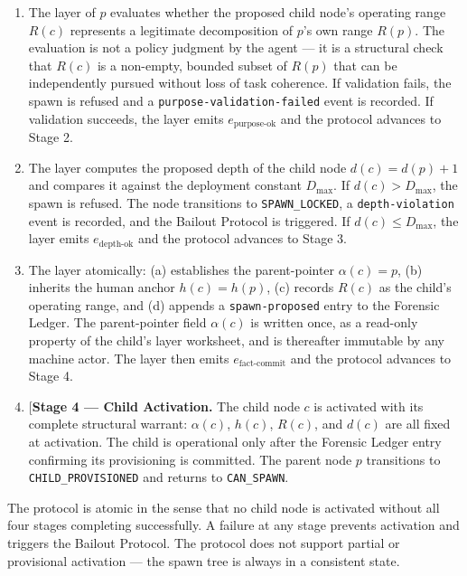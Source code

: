 \begin{enumerate}
\item[\textbf{Stage 1 — Purpose Layer Validation.}] The \purpose{} layer of $p$ evaluates whether the proposed child node's operating range $R(c)$ represents a legitimate decomposition of $p$'s own range $R(p)$. The evaluation is not a policy judgment by the agent — it is a structural check that $R(c)$ is a non-empty, bounded subset of $R(p)$ that can be independently pursued without loss of task coherence. If validation fails, the spawn is refused and a \texttt{purpose-validation-failed} event is recorded. If validation succeeds, the \purpose{} layer emits $e_{\text{purpose-ok}}$ and the protocol advances to Stage 2.

\item[\textbf{Stage 2 — Bounds Engine Depth Check.}] The \bounds{} layer computes the proposed depth of the child node $d(c) = d(p) + 1$ and compares it against the deployment constant $D_{\max}$. If $d(c) > D_{\max}$, the spawn is refused. The node transitions to \texttt{SPAWN\_LOCKED}, a \texttt{depth-violation} event is recorded, and the Bailout Protocol is triggered. If $d(c) \leq D_{\max}$, the \bounds{} layer emits $e_{\text{depth-ok}}$ and the protocol advances to Stage 3.

\item[\textbf{Stage 3 — Fact Layer: Immutable Pointer and Forensic Ledger.}] The \fact{} layer atomically: (a) establishes the parent-pointer $\alpha(c) = p$, (b) inherits the human anchor $h(c) = h(p)$, (c) records $R(c)$ as the child's operating range, and (d) appends a \texttt{spawn-proposed} entry to the Forensic Ledger. The parent-pointer field $\alpha(c)$ is written once, as a read-only property of the child's \fact{} layer worksheet, and is thereafter immutable by any machine actor. The \fact{} layer then emits $e_{\text{fact-commit}}$ and the protocol advances to Stage 4.

\item[\textbf{Stage 4 — Child Activation.} The child node $c$ is activated with its complete structural warrant: $\alpha(c)$, $h(c)$, $R(c)$, and $d(c)$ are all fixed at activation. The child is operational only after the Forensic Ledger entry confirming its provisioning is committed. The parent node $p$ transitions to \texttt{CHILD\_PROVISIONED} and returns to \texttt{CAN\_SPAWN}.
\end{enumerate}

The protocol is atomic in the sense that no child node is activated without all four stages completing successfully. A failure at any stage prevents activation and triggers the Bailout Protocol. The protocol does not support partial or provisional activation — the spawn tree is always in a consistent state.

